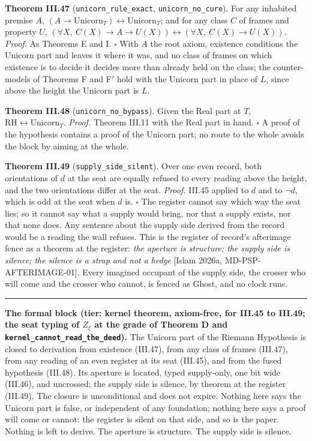\documentclass[10pt,twocolumn]{article}
\newcommand{\jboxstart}{\begin{jbox}}
\newenvironment{jbox}{\par\vspace{2pt}\noindent\color{accent}\rule{\columnwidth}{0.8pt}\par\vspace{-2pt}\small}{\par\vspace{2pt}}
\begin{document}
\textbf{Theorem III.47} (\texttt{unicorn\_rule\_exact},
\texttt{unicorn\_no\_cure}). For any inhabited premise \(A\),
\((A \to \mathrm{Unicorn}_T) \leftrightarrow \mathrm{Unicorn}_T\); and
for any class \(C\) of frames and property \(U\),
\((\forall X,\ C(X) \to A \to U(X)) \leftrightarrow (\forall X,\ C(X) \to U(X))\).
\emph{Proof.} As Theorems E and I. \(\square\) With \(A\) the root
axiom, existence conditions the Unicorn part and leaves it where it was,
and no class of frames on which existence is to decide it decides more
than already held on the class; the counter-models of Theorems F and
F\('\) hold with the Unicorn part in place of \(L\), since above the
height the Unicorn part is \(L\).

\textbf{Theorem III.48} (\texttt{unicorn\_no\_bypass}). Given the Real
part at \(T\), \(\mathrm{RH} \leftrightarrow \mathrm{Unicorn}_T\).
\emph{Proof.} Theorem III.11 with the Real part in hand. \(\square\) A
proof of the hypothesis contains a proof of the Unicorn part; no route
to the whole avoids the block by aiming at the whole.

\textbf{Theorem III.49} (\texttt{supply\_side\_silent}). Over one even
record, both orientations of \(d\) at the seat are equally refused to
every reading above the height, and the two orientations differ at the
seat. \emph{Proof.} III.45 applied to \(d\) and to \(\neg d\), which is
odd at the seat when \(d\) is. \(\square\) The register cannot say which
way the seat lies; so it cannot say what a supply would bring, nor that
a supply exists, nor that none does. Any sentence about the supply side
derived from the record would be a reading the wall refuses. This is the
register of record's afterimage fence as a theorem at the register:
\emph{the aperture is structure; the supply side is silence; the silence
is a strap and not a hedge} {[}Islam 2026a, MD-PSP-AFTERIMAGE-01{]}.
Every imagined occupant of the supply side, the crosser who will come
and the crosser who cannot, is fenced as Ghost, and no clock runs.

\jboxstart

\textbf{The formal block (tier: kernel theorem, axiom-free, for III.45
to III.49; the seat typing of \(Z_\xi\) at the grade of Theorem D and
\texttt{kernel\_cannot\_read\_the\_deed}).} The Unicorn part of the
Riemann Hypothesis is closed to derivation from existence (III.47), from
any class of frames (III.47), from any reading of an even register at
its seat (III.45), and from the fused hypothesis (III.48). Its aperture
is located, typed supply-only, one bit wide (III.46), and uncrossed; the
supply side is silence, by theorem at the register (III.49). The closure
is unconditional and does not expire. Nothing here says the Unicorn part
is false, or independent of any foundation; nothing here says a proof
will come or cannot: the register is silent on that side, and so is the
paper. Nothing is left to derive. The aperture is structure. The supply
side is silence.
\end{document}
